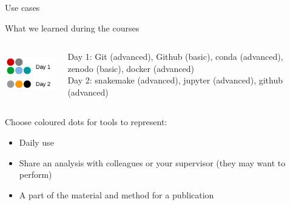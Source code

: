\begin{frame}{Use cases}
\begin{block}{What we learned during the courses}
\begin{columns}
\begin{column}{0.3\textwidth}
\includegraphics[height=2cm]{10_usecases/images/FAIR_dots_formation.png}
\end{column}
\begin{column}{0.65\textwidth}
Day 1: Git (advanced), Github (basic), conda (advanced), zenodo (basic), docker (advanced)\\
Day 2: snakemake (advanced), jupyter (advanced), github (advanced)
\end{column}
\end{columns}
\end{block}
\begin{exampleblock}{}
Choose coloured dots for tools to represent:
\begin{itemize}
    \item Daily use
    \item Share an analysis with colleagues or your supervisor (they may want to perform)
    \item A part of the material and method for a publication 
\end{itemize}
\end{exampleblock}
\end{frame}